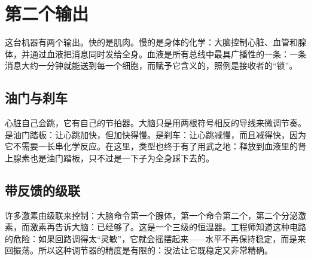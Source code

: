 \chapter{第二个输出}

这台机器有两个输出。快的是肌肉。慢的是身体的化学：大脑控制心脏、血管和腺体，并通过血液把消息同时发给全身。血液是所有总线中最具广播性的一条：一条消息大约一分钟就能送到每一个细胞，而赋予它含义的，照例是接收者的“锁”。

\section*{油门与刹车}

心脏自己会跳，它有自己的节拍器。大脑只是用两根符号相反的导线来微调节奏。是油门踏板：让心跳加快，但加快得慢。是刹车：让心跳减慢，而且减得快，因为它不需要一长串化学反应。在这里，类型也终于有了用武之地：释放到血液里的肾上腺素也是油门踏板，只不过是一下子为全身踩下去的。


\section*{带反馈的级联}

许多激素由级联来控制：大脑命令第一个腺体，第一个命令第二个，第二个分泌激素，而激素再告诉大脑：已经够了。这是一个三级的恒温器。工程师知道这种电路的危险：如果回路调得太“灵敏”，它就会摇摆起来——水平不再保持稳定，而是来回振荡。所以这种调节器的精度是有限的：没法让它既稳定又非常精确。

